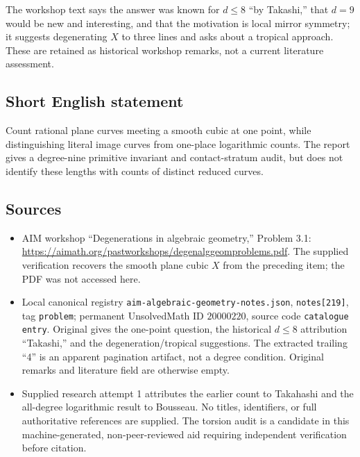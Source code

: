 \documentclass[11pt]{article}
\begin{document}
The workshop text says the answer was known for \(d\leq8\) ``by Takashi,'' that \(d=9\) would be new and interesting, and that the motivation is local mirror symmetry; it suggests degenerating \(X\) to three lines and asks about a tropical approach. These are retained as historical workshop remarks, not a current literature assessment.
\subsection{Short English statement}
Count rational plane curves meeting a smooth cubic at one point, while distinguishing literal image curves from one-place logarithmic counts. The report gives a degree-nine primitive invariant and contact-stratum audit, but does not identify these lengths with counts of distinct reduced curves.
\subsection{Sources}
\begin{itemize}
\item AIM workshop ``Degenerations in algebraic geometry,'' Problem 3.1: \url{https://aimath.org/pastworkshops/degenalggeomproblems.pdf}. The supplied verification recovers the smooth plane cubic \(X\) from the preceding item; the PDF was not accessed here.
\item Local canonical registry \texttt{aim-algebraic-geometry-notes.json}, \texttt{notes[219]}, tag \texttt{problem}; permanent UnsolvedMath ID \(20000220\), source code \texttt{catalogue entry}. Original gives the one-point question, the historical \(d\leq8\) attribution ``Takashi,'' and the degeneration/tropical suggestions. The extracted trailing ``4'' is an apparent pagination artifact, not a degree condition. Original remarks and literature field are otherwise empty.
\item Supplied research attempt 1 attributes the earlier count to Takahashi and the all-degree logarithmic result to Bousseau. No titles, identifiers, or full authoritative references are supplied. The torsion audit is a candidate in this machine-generated, non-peer-reviewed aid requiring independent verification before citation.
\end{itemize}
\end{document}
